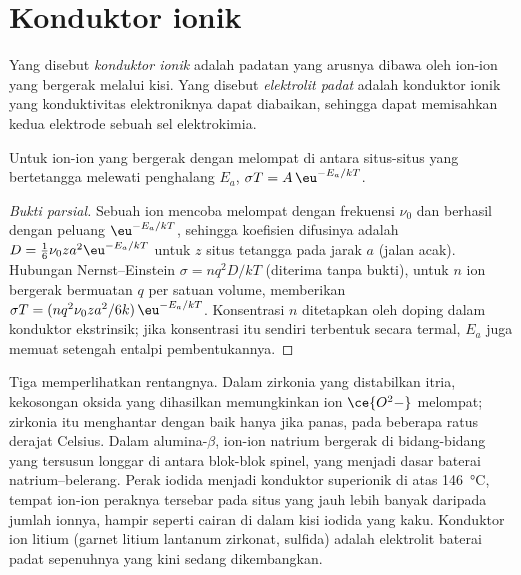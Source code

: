 \section{Konduktor ionik}

\begin{definition}\label{def:b3:solid-state:ionic-conductor}
Yang disebut \emph{konduktor ionik} adalah padatan yang arusnya
dibawa oleh ion-ion yang bergerak melalui kisi. Yang disebut \emph{elektrolit
padat} adalah konduktor ionik yang konduktivitas elektroniknya
dapat diabaikan, sehingga dapat memisahkan kedua elektrode sebuah
sel elektrokimia.
\end{definition}

\begin{proposition}\label{prop:b3:solid-state:ionic-arrhenius}
Untuk ion-ion yang bergerak dengan melompat di antara situs-situs yang bertetangga melewati penghalang $E_a$,
$\sigma T = A\,\eu^{-E_a/kT}$.
\end{proposition}

\begin{proof}[Bukti parsial]
Sebuah ion mencoba melompat dengan frekuensi $\nu_0$ dan berhasil dengan peluang $\eu^{-E_a/kT}$,
sehingga koefisien difusinya adalah $D = \tfrac16\nu_0 z a^2\eu^{-E_a/kT}$ untuk $z$ situs tetangga pada
jarak $a$ (jalan acak). Hubungan Nernst--Einstein $\sigma = nq^2D/kT$ (diterima tanpa bukti), untuk $n$
ion bergerak bermuatan $q$ per satuan volume, memberikan $\sigma T = (nq^2\nu_0za^2/6k)\,\eu^{-E_a/kT}$.
Konsentrasi $n$ ditetapkan oleh doping dalam konduktor ekstrinsik; jika konsentrasi itu
sendiri terbentuk secara termal, $E_a$ juga memuat setengah entalpi pembentukannya.
\end{proof}

Tiga  memperlihatkan rentangnya. Dalam zirkonia yang distabilkan itria,
kekosongan oksida yang dihasilkan  memungkinkan ion $\ce{O^2-}$ melompat; zirkonia itu menghantar dengan baik
hanya jika panas, pada beberapa ratus derajat Celsius. Dalam alumina-$\beta$, ion-ion natrium bergerak di
bidang-bidang yang tersusun longgar di antara blok-blok spinel, yang menjadi dasar baterai
natrium--belerang. Perak iodida menjadi konduktor superionik di atas \qty{146}{\celsius},
tempat ion-ion peraknya tersebar pada situs yang jauh lebih banyak daripada jumlah ionnya,
hampir seperti cairan di dalam kisi iodida yang kaku. Konduktor ion litium
(garnet litium lantanum zirkonat, sulfida) adalah elektrolit baterai
padat sepenuhnya yang kini sedang dikembangkan.

